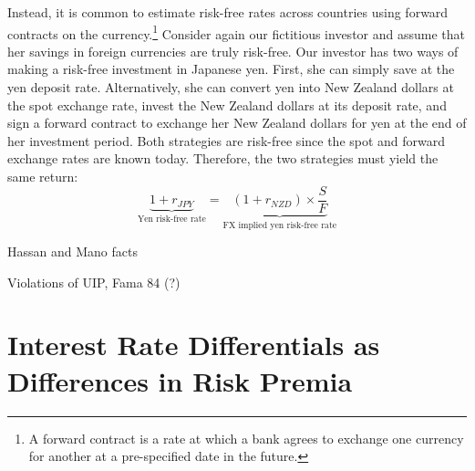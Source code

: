 \documentclass[12pt,letter]{article}
\theoremstyle{break} \theorembodyfont{\normalfont\itshape}
\theoremstyle{break}
\theoremstyle{break} \theorembodyfont{\normalfont\itshape}
\theoremstyle{break} \theorembodyfont{\normalfont\itshape}
\begin{document}
Instead, it is common to estimate risk-free rates across countries using
forward contracts on the currency.\footnote{A forward contract is a rate 
at which a bank agrees to exchange one currency for another at a
pre-specified date in the future.} Consider again our fictitious investor 
and assume that her savings in foreign currencies are truly risk-free. 
Our investor has two ways of making a risk-free investment in Japanese 
yen. First, she can simply save at the yen deposit rate. Alternatively, 
she can convert yen into New Zealand dollars at the spot exchange 
rate, invest the New Zealand dollars at its deposit rate, and sign a 
forward contract to exchange her New Zealand dollars for yen at the 
end of her investment period. Both strategies are risk-free
since the spot and forward exchange rates are known today. Therefore, 
the two strategies must yield the same return:
\begin{equation*}
    \underbrace{1 + r_{JPY}}_{\text{Yen risk-free rate}}
    = \underbrace{
    (1 + r_{NZD}) \times \frac{S}{F}
    }_{\text{FX implied yen risk-free rate}}
\end{equation*}

Hassan and Mano facts 

Violations of UIP, Fama 84 (?)

\section{Interest Rate Differentials as Differences in Risk Premia}
\end{document}

